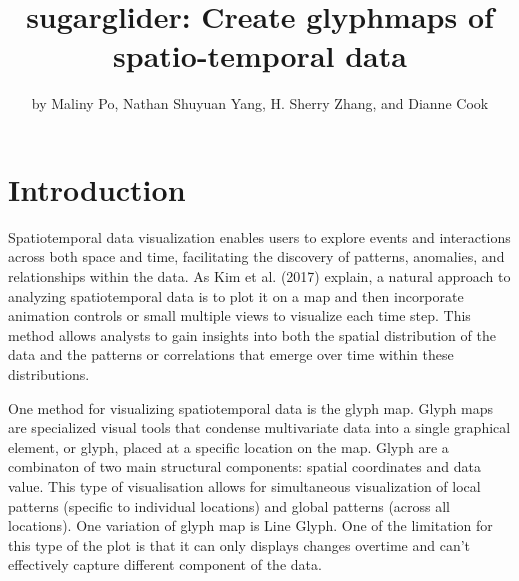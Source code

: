 \title{sugarglider: Create glyphmaps of spatio-temporal data}


\author{by Maliny Po, Nathan Shuyuan Yang, H. Sherry Zhang, and Dianne Cook}

\maketitle


\section{Introduction}\label{introduction}

Spatiotemporal data visualization enables users to explore events and interactions across both space and time, facilitating the discovery of patterns, anomalies, and relationships within the data. As Kim et al. (2017) explain, a natural approach to analyzing spatiotemporal data is to plot it on a map and then incorporate animation controls or small multiple views to visualize each time step. This method allows analysts to gain insights into both the spatial distribution of the data and the patterns or correlations that emerge over time within these distributions.

One method for visualizing spatiotemporal data is the glyph map. Glyph maps are specialized visual tools that condense multivariate data into a single graphical element, or glyph, placed at a specific location on the map. Glyph are a combinaton of two main structural components: spatial coordinates and data value. This type of visualisation allows for simultaneous visualization of local patterns (specific to individual locations) and global patterns (across all locations). One variation of glyph map is Line Glyph. One of the limitation for this type of the plot is that it can only displays changes overtime and can't effectively capture different component of the data.

